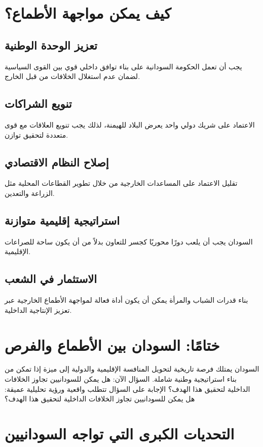 \documentclass[12pt]{article}
\begin{document}
\section{كيف يمكن مواجهة الأطماع؟}
\subsection{تعزيز الوحدة الوطنية}
يجب أن تعمل الحكومة السودانية على بناء توافق داخلي قوي بين القوى السياسية لضمان عدم استغلال الخلافات من قبل الخارج.

\subsection{تنويع الشراكات}
الاعتماد على شريك دولي واحد يعرض البلاد للهيمنة، لذلك يجب تنويع العلاقات مع قوى متعددة لتحقيق توازن.

\subsection{إصلاح النظام الاقتصادي}
تقليل الاعتماد على المساعدات الخارجية من خلال تطوير القطاعات المحلية مثل الزراعة والتعدين.

\subsection{استراتيجية إقليمية متوازنة}
السودان يجب أن يلعب دورًا محوريًا كجسر للتعاون بدلاً من أن يكون ساحة للصراعات الإقليمية.

\subsection{الاستثمار في الشعب}
بناء قدرات الشباب والمرأة يمكن أن يكون أداة فعالة لمواجهة الأطماع الخارجية عبر تعزيز الإنتاجية الداخلية.

\section{ختامًا: السودان بين الأطماع والفرص}
السودان يمتلك فرصة تاريخية لتحويل المنافسة الإقليمية والدولية إلى ميزة إذا تمكن من بناء استراتيجية وطنية شاملة. السؤال الآن: هل يمكن للسودانيين تجاوز الخلافات الداخلية لتحقيق هذا الهدف؟ الإجابة على السؤال تتطلب واقعية ورؤية تحليلية عميقة: هل يمكن للسودانيين تجاوز الخلافات الداخلية لتحقيق هذا الهدف؟

\section{التحديات الكبرى التي تواجه السودانيين}
\end{document}

